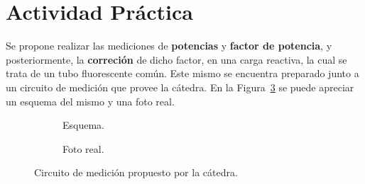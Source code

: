   \section{Actividad Práctica}
    Se propone realizar las mediciones de \textbf{potencias} y \textbf{factor de potencia}, y posteriormente,
    la \textbf{correción} de dicho factor, en una carga reactiva, la cual se trata de un tubo fluorescente 
    común. Este mismo se encuentra preparado junto a un circuito de medición que provee la cátedra. En la 
    Figura~\ref{fig:CircuitoMedicion} se puede apreciar un esquema del mismo y una foto real.

    \begin{figure}[H]
      \centering
        \begin{subfigure}[t]{\textwidth}
          \centering
          \caption{Esquema.}
          \label{fig:EsquemaCircuito}
        \end{subfigure}
        \begin{subfigure}[t]{\textwidth}
          \centering
          \caption{Foto real.}
          \label{fig:FotoRealCircuito}
        \end{subfigure}
      \caption{Circuito de medición propuesto por la cátedra.}
      \label{fig:CircuitoMedicion}
    \end{figure}

